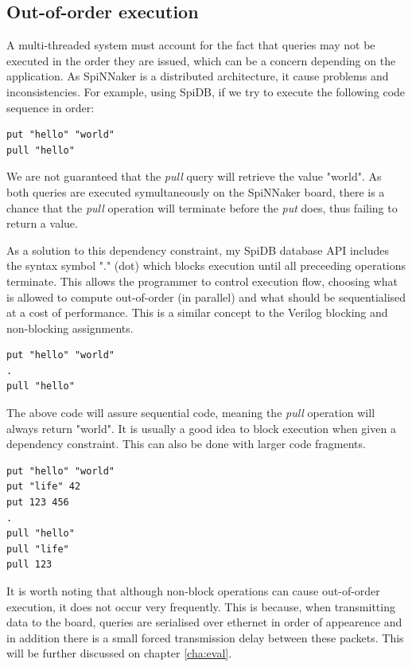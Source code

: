 \subsection{Out-of-order execution}
\label{sec:out-of-order}
A multi-threaded system must account for the fact that queries may not be executed in the order they are issued, which can be a concern depending on the application. As SpiNNaker is a distributed architecture, it cause problems and inconsistencies.
For example, using SpiDB, if we try to execute the following code sequence in order:\\
\begin{lstlisting}[caption={Non-blocking execution}, label=list:non-blocking]
put "hello" "world"
pull "hello"
\end{lstlisting}

We are not guaranteed that the \textit{pull} query will retrieve the value "world". As both queries are executed symultaneously on the SpiNNaker board, there is a chance that the \textit{pull} operation will terminate before the \textit{put} does, thus failing to return a value.

As a solution to this dependency constraint, my SpiDB database API includes the syntax symbol "." (dot) which blocks execution until all preceeding operations terminate. This allows the programmer to control execution flow, choosing what is allowed to compute out-of-order (in parallel) and what should be sequentialised at a cost of performance. This is a similar concept to the Verilog blocking and non-blocking assignments.

\begin{lstlisting}[caption={Blocking execution}, label=list:blocking1]
put "hello" "world"
.
pull "hello"
\end{lstlisting}

The above code will assure sequential code, meaning the \textit{pull} operation will always return "world". It is usually a good idea to block execution when given a dependency constraint. This can also be done with larger code fragments.

\begin{lstlisting}[caption={Blocking execution}, label=list:blocking2]
put "hello" "world"
put "life" 42
put 123 456
.
pull "hello"
pull "life"
pull 123
\end{lstlisting}

It is worth noting that although non-block operations can cause out-of-order execution, it does not occur very frequently. This is because, when transmitting data to the board, queries are serialised over ethernet in order of appearence and in addition there is a small forced transmission delay between these packets. This will be further discussed on chapter \ref{cha:eval}.

